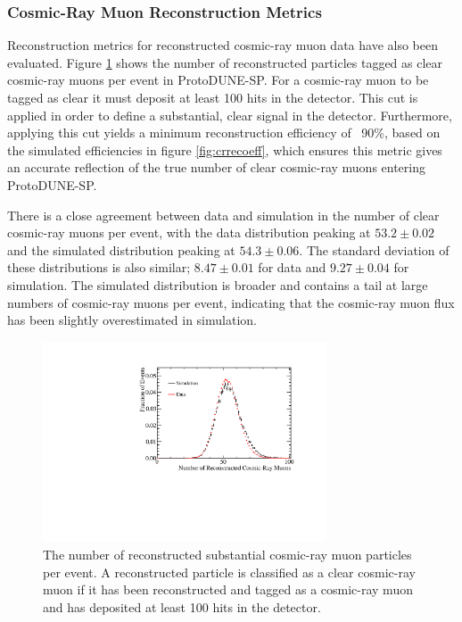 \subsubsection{Cosmic-Ray Muon Reconstruction Metrics}
Reconstruction metrics for reconstructed cosmic-ray muon data have also been evaluated.  Figure \ref{fig:ncrdata} shows the number of reconstructed particles tagged as clear cosmic-ray muons per event in ProtoDUNE-SP.  For a cosmic-ray muon to be tagged as clear it must deposit at least 100 hits in the detector.  This cut is applied in order to define a substantial, clear signal in the detector.  Furthermore, applying this cut yields a minimum reconstruction efficiency of ~90\%, based on the simulated efficiencies in figure \ref{fig:crrecoeff}, which ensures this metric gives an accurate reflection of the true number of clear cosmic-ray muons entering ProtoDUNE-SP.

There is a close agreement between data and simulation in the number of clear cosmic-ray muons per event, with the data distribution peaking at $53.2\pm0.02$ and the simulated distribution peaking at $54.3\pm0.06$.  The standard deviation of these distributions is also similar; $8.47\pm0.01$ for data and $9.27\pm0.04$ for simulation.  The simulated distribution is broader and contains a tail at large numbers of cosmic-ray muons per event, indicating that the cosmic-ray muon flux has been slightly overestimated in simulation.  

\begin{figure}
\centering
\includegraphics[width=0.75\textwidth]{Figures/Metrics/Data/Cosmics/NumberofReconstructedCosmicRays.pdf}
\caption{The number of reconstructed substantial cosmic-ray muon particles per event.  A reconstructed particle is classified as a clear cosmic-ray muon if it has been reconstructed and tagged as a cosmic-ray muon and has deposited at least 100 hits in the detector.}
\label{fig:ncrdata}
\end{figure}

